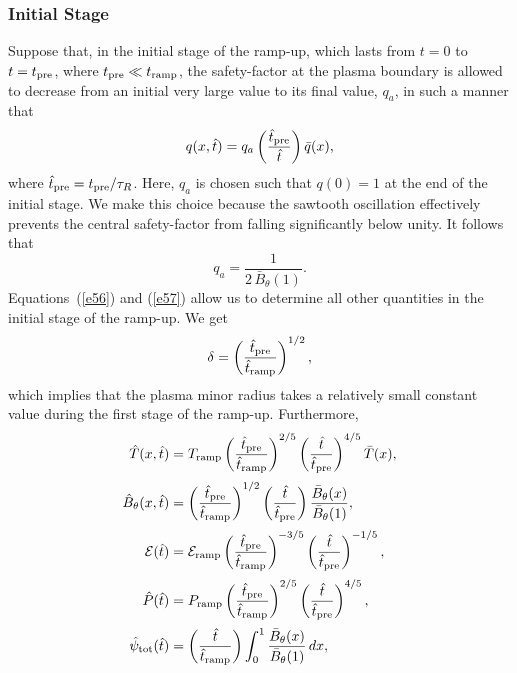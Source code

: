 \documentclass[12pt,prb,aps]{revtex4-1}
\begin{document}
\subsubsection{Initial Stage}
Suppose that, in the initial stage of the ramp-up, which lasts from $t=0$ to $t=t_{\rm pre}$, where $t_{\rm pre}\ll t_{\rm ramp}$, 
the safety-factor at the plasma boundary is allowed to decrease from an initial very large value to its final value, $q_a$, in such a manner that
\begin{equation}\label{e57}
q(x,\hat{t}) = q_a\left(\frac{\hat{t}_{\rm pre}}{\hat{t}}\right)\bar{q}(x),
\end{equation}
where $\hat{t}_{\rm pre}= t_{\rm pre}/\tau_R$. Here, $q_a$ is chosen such that $q(0)=1$ at the end of the initial stage. We make this choice because the
sawtooth oscillation effectively prevents the central safety-factor from falling significantly below unity.\cite{book} It follows that
\begin{equation}
q_a = \frac{1}{2\,\bar{B}_\theta(1)}.
\end{equation}
Equations~(\ref{e56}) and (\ref{e57}) allow us to determine all other quantities in the initial
stage of the ramp-up. We get
\begin{equation}
\delta = \left(\frac{\hat{t}_{\rm pre}}{\hat{t}_{\rm ramp}}\right)^{1/2},
\end{equation}
which implies that the plasma minor radius takes a relatively small constant value during the first stage of the ramp-up. 
Furthermore,
\begin{align}
\hat{T}(x,\hat{t}) &= T_{\rm ramp}\left(\frac{\hat{t}_{\rm pre}}{\hat{t}_{\rm ramp}}\right)^{2/5}\left(\frac{\hat{t}}{\hat{t}_{\rm pre}}\right)^{4/5}\bar{T}(x),\\[0.5ex]
\hat{B}_\theta(x,\hat{t})&= \left(\frac{\hat{t}_{\rm pre}}{\hat{t}_{\rm ramp}}\right)^{1/2}\left(\frac{\hat{t}}{\hat{t}_{\rm pre}}\right)\frac{\bar{B}_\theta(x)}{\bar{B}_\theta(1)},\\[0.5ex]
{\cal E}(\hat{t}) &= {\cal E}_{\rm ramp}\left(\frac{\hat{t}_{\rm pre}}{\hat{t}_{\rm ramp}}\right)^{-3/5}\left(\frac{\hat{t}}{\hat{t}_{\rm pre}}\right)^{-1/5},\\[0.5ex]
\hat{P}(\hat{t}) &= P_{\rm ramp}\left(\frac{\hat{t}_{\rm pre}}{\hat{t}_{\rm ramp}}\right)^{2/5}\left(\frac{\hat{t}}{\hat{t}_{\rm pre}}\right)^{4/5},\\[0.5ex]
\hat{\psi}_{\rm tot}(\hat{t})&= \left(\frac{\hat{t}}{\hat{t}_{\rm ramp}}\right)\int_0^1\frac{\bar{B}_{\theta}(x)}{\bar{B}_\theta(1)}\,dx,
\end{align}
\end{document}

